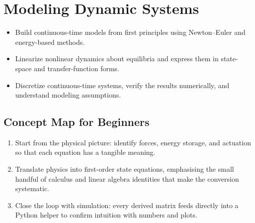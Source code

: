 \chapter{Modeling Dynamic Systems}
\label{chap:modeling}

\begin{learningobjective}
\begin{itemize}[leftmargin=*]
    \item Build continuous-time models from first principles using Newton--Euler and energy-based methods.
    \item Linearize nonlinear dynamics about equilibria and express them in state-space and transfer-function forms.
    \item Discretize continuous-time systems, verify the results numerically, and understand modeling assumptions.
\end{itemize}
\end{learningobjective}

\section{Concept Map for Beginners}
\begin{conceptroadmap}
\begin{enumerate}[leftmargin=*]
    \item Start from the physical picture: identify forces, energy storage, and actuation so that each equation has a tangible meaning.
    \item Translate physics into first-order state equations, emphasising the small handful of calculus and linear algebra identities that make the conversion systematic.
    \item Close the loop with simulation: every derived matrix feeds directly into a Python helper to confirm intuition with numbers and plots.
\end{enumerate}
\end{conceptroadmap}

